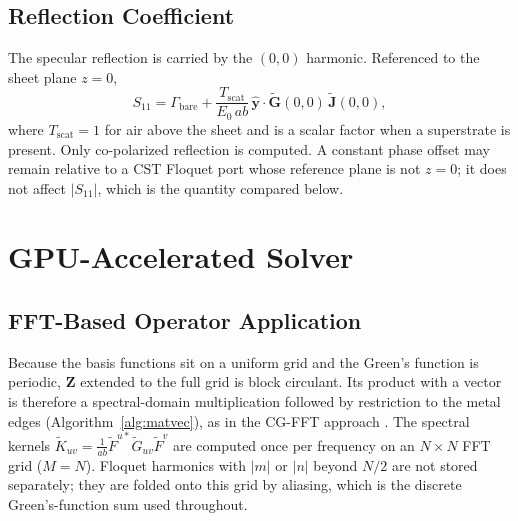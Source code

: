 \documentclass[10pt,conference]{IEEEtran}
\newcommand{\vect}[1]{\mathbf{#1}}
\newcommand{\Gt}{\tilde{\mathbf{G}}}
\begin{document}
	\subsection{Reflection Coefficient}
	
	The specular reflection is carried by the $(0,0)$ harmonic. Referenced to
	the sheet plane $z=0$,
	\begin{equation}
		S_{11}=\Gamma_{\mathrm{bare}}+\frac{T_{\mathrm{scat}}}{E_0\,ab}\,
		\hat{\vect{y}}\cdot\Gt(0,0)\,\tilde{\vect{J}}(0,0),
		\label{eq:s11}
	\end{equation}
	where $T_{\mathrm{scat}}=1$ for air above the sheet and is a scalar factor
	when a superstrate is present. Only co-polarized reflection is computed. A
	constant phase offset may remain relative to a CST Floquet port whose
	reference plane is not $z=0$; it does not affect $|S_{11}|$, which is the
	quantity compared below.
	
	\section{GPU-Accelerated Solver}
	\label{sec:gpu}
	
	\subsection{FFT-Based Operator Application}
	
	Because the basis functions sit on a uniform grid and the Green's function is
	periodic, $\vect{Z}$ extended to the full grid is block circulant. Its product
	with a vector is therefore a spectral-domain multiplication followed by
	restriction to the metal edges (Algorithm~\ref{alg:matvec}), as in the CG-FFT
	approach \cite{cwik1987}. The spectral kernels
	$\tilde{K}_{uv}=\frac{1}{ab}\tilde{F}^{u*}\tilde{G}_{uv}\tilde{F}^{v}$ are
	computed once per frequency on an $N\times N$ FFT grid ($M=N$). Floquet
	harmonics with $|m|$ or $|n|$ beyond $N/2$ are not stored separately; they
	are folded onto this grid by aliasing, which is the discrete Green's-function
	sum used throughout.
	
\end{document}
